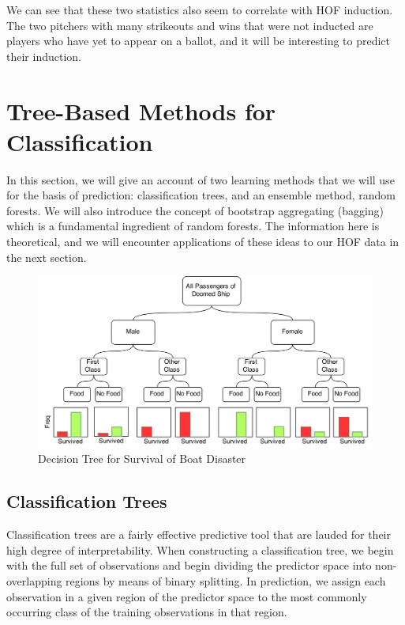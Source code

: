 \documentclass[preprint,12pt]{elsarticle}
\begin{document}
We can see that these two statistics also seem to correlate with HOF induction. The two pitchers with many strikeouts and wins that were not inducted are players who have yet to appear on a ballot, and it will be interesting to predict their induction.






\section{Tree-Based Methods for Classification}

In this section, we will give an account of two learning methods that we will use for the basis of prediction: classification trees, and an ensemble method, random forests. We will also introduce the concept of bootstrap aggregating (bagging) which is a fundamental ingredient of random forests. The information here is theoretical, and we will encounter applications of these ideas to our HOF data in the next section.
\begin{figure}[h]
	\centering
	\includegraphics[width=1\textwidth]{TreeExample}
	\caption{Decision Tree for Survival of Boat Disaster}
	\label{fig:SampleTree}
\end{figure}
\subsection{Classification Trees}
Classification trees are a fairly effective predictive tool that are lauded for their high degree of interpretability. When constructing a classification tree, we begin with the full set of observations and begin dividing the predictor space into non-overlapping regions by means of binary splitting. In prediction, we assign each observation in a given region of the predictor space to the most commonly occurring class of the training observations in that region. 
\end{document}
